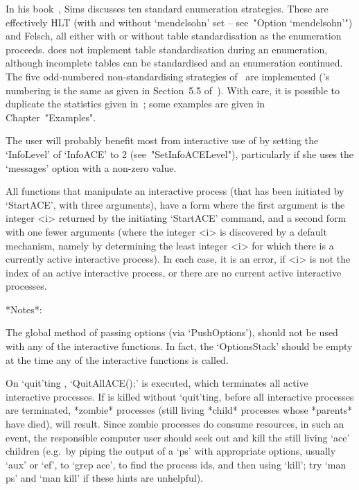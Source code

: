 In his book~\cite{Sim94},  Sims  discusses  ten  standard  enumeration
strategies. These are effectively HLT (with and  without  `mendelsohn'
set -- see~"Option `mendelsohn'")  and  Felsch,  all  either  with  or
without table standardisation as the enumeration proceeds. {\ACE} does
not implement table standardisation during  an  enumeration,  although
incomplete tables can be standardised and  an  enumeration  continued.
The five odd-numbered non-standardising strategies of~\cite{Sim94} are
implemented ({\ACE}'s numbering is the same as  given  in  Section~5.5
of~\cite{Sim94}).  With  care,  it  is  possible  to   duplicate   the
statistics  given  in~\cite{Sim94};  some  examples   are   given   in
Chapter~"Examples". %

\enditems


The user will probably benefit most from interactive use of {\ACE}  by
setting the `InfoLevel' of  `InfoACE'  to  2  (see~"SetInfoACELevel"),
particularly if she uses the `messages' option with a non-zero value.

All functions that manipulate an interactive process  (that  has  been
initiated by `StartACE', with three arguments), have a form where  the
first  argument  is  the  integer  <i>  returned  by  the   initiating
`StartACE' command, and a second form with one fewer arguments  (where
the integer <i> is  discovered  by  a  default  mechanism,  namely  by
determining the least integer <i>  for  which  there  is  a  currently
active interactive {\ACE} process). In each case, it is an  error,  if
<i> is not the index of an active interactive process, or there are no
current active interactive processes.

*Notes*: 

The global method of passing options (via `PushOptions'),  should  not
be  used  with  any  of  the  interactive  functions.  In  fact,   the
`OptionsStack' should be empty at the  time  any  of  the  interactive
functions is called.

On `quit'ting {\GAP}, `QuitAllACE();' is  executed,  which  terminates
all active interactive {\ACE} processes. If {\GAP} is  killed  without
`quit'ting, before all interactive {\ACE}  processes  are  terminated,
*zombie* processes (still living  *child*  processes  whose  *parents*
have died), will result. Since zombie processes do consume  resources,
in such an event, the responsible computer user should  seek  out  and
kill the still living `ace' children (e.g.~by piping the output  of  a
`ps' with appropriate options, usually `aux' or `ef', to  `grep  ace',
to find the process ids, and then using `kill'; try `man ps' and  `man
kill' if these hints are unhelpful).

